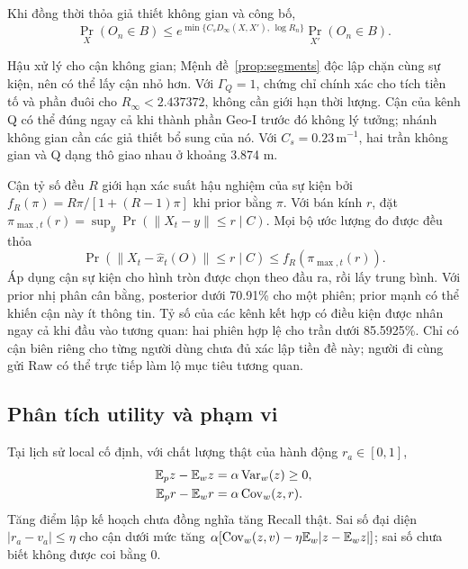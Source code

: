 \begin{theorem}\label{thm:endtoend}
Khi đồng thời thỏa giả thiết không gian và công bố,
\begin{equation}
\Pr_X(O_n\in B)\le
e^{\min\{C_sD_\infty(X,X'),\,\log R_n\}}\Pr_{X'}(O_n\in B). \label{eq:endtoend}
\end{equation}
\end{theorem}
\noindent
Hậu xử lý cho cận không gian; Mệnh đề~\ref{prop:segments} độc lập chặn cùng
sự kiện, nên có thể lấy cận nhỏ hơn. Với $\Gamma_Q=1$, chứng chỉ chính xác
cho tích tiền tố và phần đuôi cho $R_\infty<2.437372$, không cần giới hạn
thời lượng. Cận của kênh Q có thể đúng ngay cả khi thành phần Geo-I trước đó
không lý tưởng; nhánh không gian cần các giả thiết bổ sung của nó.
Với $C_s=0.23\,\mathrm m^{-1}$, hai trần không gian và Q dạng thô giao nhau
ở khoảng 3.874 m.

Cận tỷ số đều $R$ giới hạn xác suất hậu nghiệm của sự kiện bởi
$f_R(\pi)=R\pi/[1+(R-1)\pi]$ khi prior bằng $\pi$.
Với bán kính $r$, đặt
$\pi_{\max,t}(r)=\sup_y\Pr(\|X_t-y\|\le r\mid C)$.
Mọi bộ ước lượng đo được đều thỏa
\begin{equation}
\Pr(\|X_t-\widehat x_t(O)\|\le r\mid C)
\le f_R(\pi_{\max,t}(r)). \label{eq:hit}
\end{equation}
Áp dụng cận sự kiện cho hình tròn được chọn theo đầu ra, rồi lấy trung bình.
Với prior nhị phân cân bằng, posterior dưới 70.91\% cho một phiên; prior
mạnh có thể khiến cận này ít thông tin. Tỷ số của các kênh kết hợp có điều
kiện được nhân ngay cả khi đầu vào tương quan: hai phiên hợp lệ cho trần
dưới 85.5925\%. Chỉ có cận biên riêng cho từng người dùng chưa đủ xác lập
tiền đề này; người đi cùng gửi Raw có thể trực tiếp làm lộ mục tiêu tương quan.

\subsection{Phân tích utility và phạm vi}\label{sec:utility}
Tại lịch sử local cố định, với chất lượng thật của hành động $r_a\in[0,1]$,
\begin{align}
\mathbb E_pz-\mathbb E_wz&=\alpha\operatorname{Var}_w(z)\ge0,\\
\mathbb E_pr-\mathbb E_wr&=\alpha\operatorname{Cov}_w(z,r). \label{eq:gain}
\end{align}
Tăng điểm lập kế hoạch chưa đồng nghĩa tăng Recall thật.
Sai số đại diện $|r_a-v_a|\le\eta$ cho cận dưới mức tăng
$\alpha[\operatorname{Cov}_w(z,v)-\eta\mathbb E_w|z-\mathbb E_wz|]$; sai số chưa biết không được coi bằng 0.

